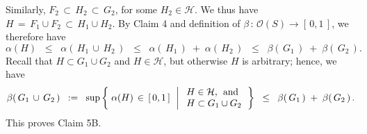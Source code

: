 Similarly, $F_{2} \,\subset\, H_{2} \,\subset\, G_{2}$, for some $H_{2} \in \mathcal{H}$.
We thus have $H \,=\, F_{1} \cup F_{2} \,\subset\, H_{1} \cup H_{2}$.
By Claim 4 and definition of $\beta \,:\, \mathcal{O}(S) \longrightarrow [\,0,1\,]$, we therefore have
\begin{equation*}
\alpha(H)
\;\; \leq \;\; \alpha\!\left(\,H_{1}\,\cup\,H_{2}\,\right)
\;\; \leq \;\; \alpha\!\left(\,H_{1}\,\right) \; + \; \alpha\!\left(\,H_{2}\,\right)
\;\; \leq \;\; \beta\!\left(\,G_{1}\,\right) \; + \; \beta\!\left(\,G_{2}\,\right).
\end{equation*}
Recall that $H \subset G_{1} \cup G_{2}$ and $H \in \mathcal{H}$, but otherwise $H$ is arbitrary;
hence, we have
\begin{equation*}
\beta\!\left(\,G_{1}\,\cup\,G_{2}\,\right)
\;\; := \;\;
\sup\left\{\;
	\alpha(H) \,\in\, [\,0,1\,]
	\,\;\left\vert\;
		\begin{array}{l} H \in \mathcal{H}, \;\,\textnormal{and} \\ H \subset G_{1} \cup G_{2} \end{array}
	\right.
\right\}
\;\;\leq\;\; \beta\!\left(\,G_{1}\,\right) \; + \; \beta\!\left(\,G_{2}\,\right).
\end{equation*}
This proves Claim 5B. %

